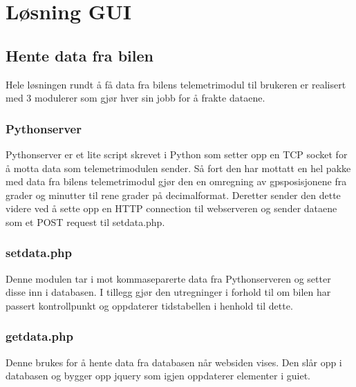 \section{Løsning GUI}
\subsection{Hente data fra bilen}
Hele løsningen rundt å få data fra bilens telemetrimodul til brukeren er realisert med 3 modulerer som gjør hver sin jobb for å frakte dataene.
\subsubsection{Pythonserver}
Pythonserver er et lite script skrevet i Python som setter opp en TCP socket for å motta data som telemetrimodulen sender. Så fort den har mottatt en hel pakke med data fra bilens telemetrimodul gjør den en omregning av gpsposisjonene fra grader og minutter til rene grader på decimalformat. Deretter sender den dette videre ved å sette opp en HTTP connection til webserveren og sender dataene som et POST request til setdata.php.
\subsubsection{setdata.php}
Denne modulen tar i mot kommaseparerte data fra Pythonserveren og setter disse inn i databasen. I tillegg gjør den utregninger i forhold til om bilen har passert kontrollpunkt og oppdaterer tidstabellen i henhold til dette.
\subsubsection{getdata.php}
Denne brukes for å hente data fra databasen når websiden vises. Den slår opp i databasen og bygger opp jquery som igjen oppdaterer elementer i guiet.

